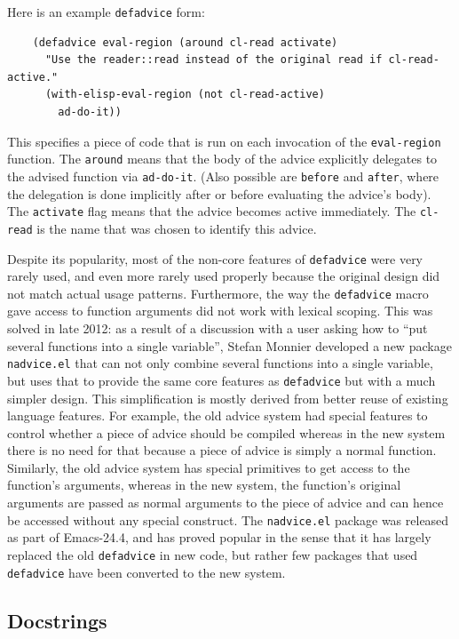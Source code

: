\documentclass[format=acmsmall, review]{acmart}
\begin{document}
Here is an example \texttt{defadvice} form:
%
\begin{verbatim}
    (defadvice eval-region (around cl-read activate)
      "Use the reader::read instead of the original read if cl-read-active."
      (with-elisp-eval-region (not cl-read-active)
        ad-do-it))
\end{verbatim}
%
This specifies a piece of code that is run on each invocation of the
\texttt{eval-region} function.  The \texttt{around} means that the
body of the advice explicitly delegates to the
advised function via \texttt{ad-do-it}.  (Also possible are
\texttt{before} and \texttt{after}, where the delegation is done implicitly
after or before evaluating the advice's body).  The
\texttt{activate} flag means that the advice becomes active
immediately.  The \texttt{cl-read} is the name that was chosen to identify
this advice.

Despite its popularity, most of the non-core features of \texttt{defadvice}
were very rarely used, and even more rarely used properly because the
original design did not match actual usage patterns.  Furthermore, the way
the \texttt{defadvice} macro gave access to function arguments did not work
with lexical scoping.  This was solved in late 2012: as a result of
a discussion with a user asking how to ``put several functions into
a single variable'', Stefan Monnier developed a new package
\texttt{nadvice.el} that can not only combine several functions into
a single variable, but uses that to provide the same core features as
\texttt{defadvice} but with a much simpler design.  This simplification is
mostly derived from better reuse of existing language features.
For example, the old advice system had special features to control whether
a piece of advice should be compiled whereas in the new system there is no
need for that because a piece of advice is simply a normal function.
Similarly, the old advice system has special primitives to get access to the
function's arguments, whereas in the new system, the function's original
arguments are passed as normal arguments to the piece of advice and can
hence be accessed without any special construct.  The \texttt{nadvice.el}
package was released as part of Emacs-24.4, and has proved popular in the
sense that it has largely replaced the old \texttt{defadvice} in new code,
but rather few packages that used \texttt{defadvice} have been converted to
the new system.

\subsection{Docstrings}
\label{sec:docstrings}
\end{document}
